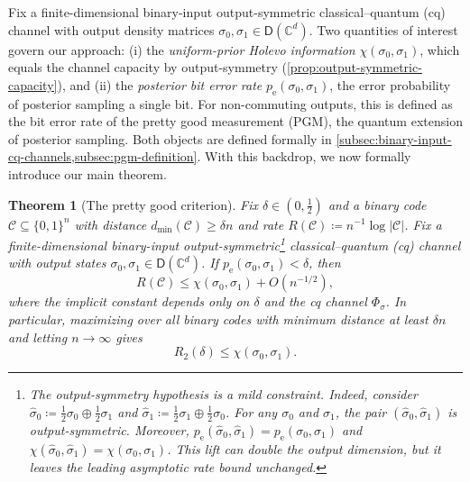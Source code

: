 \documentclass[11pt]{article}
\renewcommand{\leq}{\leqslant}
\renewcommand{\geq}{\geqslant}
\newtheorem{theorem}{Theorem}
\theoremstyle{remark}
\newcommand{\cC}{\mathcal{C}}
\newcommand{\C}{\mathbb{C}}
\newcommand{\Dens}{\mathsf{D}}
\newcommand{\bits}{\{0,1\}}
\newcommand{\abs}[1]{\left|#1\right|}
\begin{document}
Fix a finite-dimensional binary-input output-symmetric classical--quantum (cq) channel with output density matrices $\sigma_0,\sigma_1 \in \Dens(\C^d)$. Two quantities of interest govern our approach: (i) the \emph{uniform-prior Holevo information} $\chi(\sigma_0,\sigma_1)$, which equals the channel capacity by output-symmetry (\cref{prop:output-symmetric-capacity}), and (ii) the \emph{posterior bit error rate} $p_{\mathrm{e}}(\sigma_0,\sigma_1)$, the error probability of posterior sampling a single bit. For non-commuting outputs, this is defined as the bit error rate of the pretty good measurement (PGM), the quantum extension of posterior sampling. Both objects are defined formally in \cref{subsec:binary-input-cq-channels,subsec:pgm-definition}. With this backdrop, we now formally introduce our main theorem. 

\begin{theorem}[The pretty good criterion]
\label{thm:main-result}
Fix $\delta \in (0,\frac{1}{2})$ and a binary code $\cC \subseteq \bits^n$ with distance $d_{\min}(\cC) \geq \delta n$ and rate $R(\cC) \coloneqq n^{-1}\log{\abs{\cC}}$. Fix a finite-dimensional binary-input output-symmetric\footnote{\label{fn:output-symmetry-lift}The output-symmetry hypothesis is a mild constraint. Indeed, consider $\widehat{\sigma}_0 \coloneqq \frac{1}{2}\sigma_0 \oplus \frac{1}{2}\sigma_1$ and $\widehat{\sigma}_1 \coloneqq \frac{1}{2}\sigma_1 \oplus \frac{1}{2}\sigma_0$. For any $\sigma_0$ and $\sigma_1$, the pair $(\widehat{\sigma}_0,\widehat{\sigma}_1)$ is output-symmetric. Moreover, $p_{\mathrm{e}}(\widehat{\sigma}_0,\widehat{\sigma}_1) = p_{\mathrm{e}}(\sigma_0,\sigma_1)$ and $\chi(\widehat{\sigma}_0,\widehat{\sigma}_1) = \chi(\sigma_0,\sigma_1)$. This lift can double the output dimension, but it leaves the leading asymptotic rate bound unchanged.} classical--quantum (cq) channel with output states $\sigma_0,\sigma_1 \in \Dens(\C^d)$. If $p_{\mathrm{e}}(\sigma_0,\sigma_1) < \delta$, then
\begin{equation} 
R(\cC) \leq \chi(\sigma_0,\sigma_1) + O(n^{-1/2}),
\end{equation}
where the implicit constant depends only on $\delta$ and the cq channel $\Phi_\sigma$. In particular, maximizing over all binary codes with minimum distance at least $\delta n$ and letting $n \to \infty$ gives
\begin{equation}
R_2(\delta) \leq \chi(\sigma_0,\sigma_1).
\end{equation}
\end{theorem}
\end{document}
